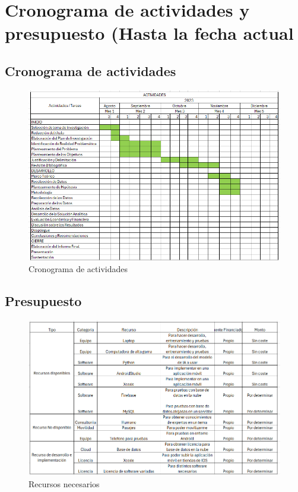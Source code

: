 \section{Cronograma de actividades y presupuesto (Hasta la fecha actual}
\subsection{Cronograma de actividades}
\begin{figure}[ht]
	\centering
	\includegraphics[width=\textwidth]{3/figures/Cronograma de actividades hasta la fecha.png}
	\caption{Cronograma de actividades}
	\label{15:fig}
\end{figure}

\subsection{Presupuesto}
\begin{figure}[ht]
	\centering
	\includegraphics[width=\textwidth]{3/figures/Recursos.png}
	\caption{Recursos necesarios}
	\label{16:fig}
\end{figure}
